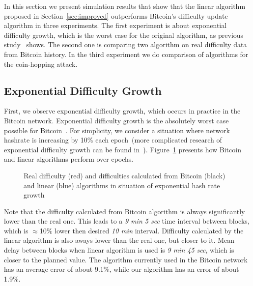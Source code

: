 \documentclass[]{llncs}
\begin{document}
In this section we present simulation results that show that the linear algorithm proposed in Section~\ref{sec:improved} outperforms Bitcoin's difficulty update algorithm in three experiments. The first experiment is about exponential difficulty growth, which is the worst case for the original algorithm, as previous study~\cite{kraft2015difficulty} shows. The second one is comparing two algorithm on real difficulty data from Bitcoin history. In the third experiment we do comparison of algorithms for the coin-hopping attack.   

\subsection{Exponential Difficulty Growth}
\label{sec:experiment}
First, we observe exponential difficulty growth, which occurs in practice in the Bitcoin network. Exponential difficulty growth is the absolutely worst case possible for Bitcoin~\cite{kraft2015difficulty}.
For simplicity, we consider a situation where network hashrate is increasing by 10\% each epoch~(more complicated research of exponential difficulty growth can be found in~\cite{kraft2015difficulty}).
Figure~\ref{fig:exp} presents how Bitcoin and linear algorithms perform over epochs.

\begin{figure}[h]
\caption{Real difficulty (red) and difficulties calculated from Bitcoin (black) and linear (blue) algorithms in situation of exponential hash rate growth}
\label{fig:exp}
\end{figure}

Note that the difficulty calculated from Bitcoin algorithm is always significantly lower than the real one.
This leads to a {\em 9 min 5 sec} time interval between blocks, which is $\approx$10\% lower then desired {\em 10 min} interval.
Difficulty calculated by the linear algorithm is also aways lower than the real one, but closer to it.
Mean delay between blocks when linear algorithm is used is {\em 9 min 45 sec}, which is closer to the planned value. The algorithm currently used in the Bitcoin network has an average error of about 9.1\%, while our algorithm has an error of about 1.9\%.
\end{document}
